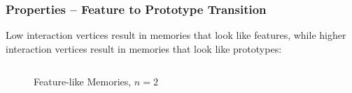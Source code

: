 \begin{frame}
    \frametitle{Properties -- Feature to Prototype Transition}

Low interaction vertices result in memories that look like features, while higher interaction vertices result in memories that look like prototypes:

\begin{columns}
    \begin{figure}
    \caption{Feature-like Memories, \(n=2\)}
    \end{figure}
\end{columns}
\end{frame}
